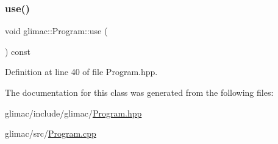 \subsubsection{\texorpdfstring{use()}{use()}}
{\footnotesize\ttfamily void glimac\+::\+Program\+::use (\begin{DoxyParamCaption}{ }\end{DoxyParamCaption}) const\hspace{0.3cm}{\ttfamily [inline]}}



Definition at line 40 of file Program.\+hpp.



The documentation for this class was generated from the following files\+:\begin{DoxyCompactItemize}
\item 
glimac/include/glimac/\hyperlink{_program_8hpp}{Program.\+hpp}\item 
glimac/src/\hyperlink{_program_8cpp}{Program.\+cpp}\end{DoxyCompactItemize}
